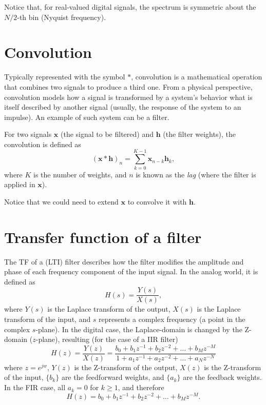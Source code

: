 Notice that, for real-valued digital signals, the spectrum is
symmetric about the $N/2$-th bin (Nyquist frequency).


\section{Convolution}
\label{sec:convolution}

Typically represented with the symbol $\ast$, convolution is a
mathematical operation that combines two signals to produce a third
one. From a physical perspective, convolution models how a signal
is transformed by a system's behavior what is itself described by
another signal (usually, the response of the system to an
impulse). An example of such system can be a filter.

For two signals $\bm{x}$ (the signal to be filtered) and
$\bm{h}$ (the filter weights), the convolution is defined as
\begin{equation}
(\bm{x}\ast\bm{h})_{n}=\sum_{k=0}^{K-1}\mathbf{x}_{n-k}\mathbf{h}_{k},
\label{eq:convolution}
\end{equation}
where $K$ is the number of weights, and $n$ is known as the \emph{lag}
(where the filter is applied in $\bm{x}$).

Notice that we could need to extend $\bm{x}$ to convolve it with
$\bm{h}$.


\section{Transfer function of a filter}
\label{sec:TF_filter}

The \gls{TF} of a (\gls{LTI}) filter describes how the filter modifies
the amplitude and phase of each frequency component of the input
signal. In the analog world, it is defined as
\begin{equation}
  H(s) = \frac{Y(s)}{X(s)},
\end{equation}
where $Y(s)$ is the Laplace transform of the output, $X(s)$ is the
Laplace transform of the input, and $s$ represents a complex frequency
(a point in the complex $s$-plane). In the digital case, the
Laplace-domain is changed by the Z-domain ($z$-plane), resulting
(for the case of a \gls{IIR} filter)
\begin{equation}
  H(z) = \frac{Y(z)}{X(z)} = \frac{b_0 + b_1 z^{-1} + b_2 z^{-2} + \dots + b_M z^{-M}}{1 + a_1 z^{-1} + a_2 z^{-2} + \dots + a_N z^{-N}}
\end{equation}
where $z=e^{jw}$, $Y(z)$ is the Z-transform of the output, $X(z)$ is the
Z-transform of the input, $\{b_k\}$ are the feedforward weights,
and $\{a_k\}$ are the feedback weights. In the \gls{FIR} case,
all $a_k=0$ for $k\ge 1$, and therefore
\begin{equation}
  H(z) = b_0 + b_1 z^{-1} + b_2 z^{-2} + \dots + b_M z^{-M}.
\end{equation}

